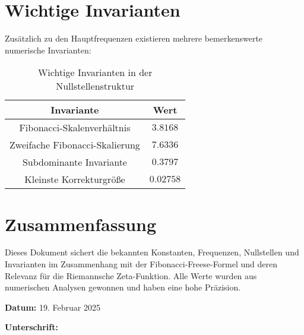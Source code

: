 \documentclass[a4paper,12pt]{article}
\begin{document}
\section{Wichtige Invarianten}
Zusätzlich zu den Hauptfrequenzen existieren mehrere bemerkenswerte numerische Invarianten:

\begin{table}[h]
    \centering
    \renewcommand{\arraystretch}{1.4}
    \begin{tabular}{c c}
        \toprule
        \textbf{Invariante} & \textbf{Wert} \\
        \midrule
        Fibonacci-Skalenverhältnis & \( 3.8168 \) \\
        Zweifache Fibonacci-Skalierung & \( 7.6336 \) \\
        Subdominante Invariante & \( 0.3797 \) \\
        Kleinste Korrekturgröße & \( 0.02758 \) \\
        \bottomrule
    \end{tabular}
    \caption{Wichtige Invarianten in der Nullstellenstruktur}
\end{table}

\section{Zusammenfassung}
Dieses Dokument sichert die bekannten Konstanten, Frequenzen, Nullstellen und Invarianten im Zusammenhang mit der Fibonacci-Freese-Formel und deren Relevanz für die Riemannsche Zeta-Funktion. Alle Werte wurden aus numerischen Analysen gewonnen und haben eine hohe Präzision.

\vspace{1cm}

\noindent \textbf{Datum:} 19. Februar 2025

\vspace{1cm}

\noindent \textbf{Unterschrift:} \underline{\hspace{5cm}}
\end{document}

